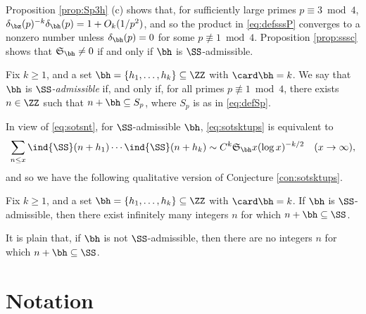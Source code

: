 \documentclass[12pt, reqno, twoside, letterpaper]{amsart}
\begin{document}
\begin{nixnix}
Proposition \ref{prop:Sp3h} (c) shows that, for sufficiently 
large primes $p \equiv 3 \bmod 4$, 
$\delta_{\bz}(p)^{-k}\delta_{\bh}(p) = 1 + O_k(1/p^2)$, and so 
the product in \eqref{eq:defsssP} converges to a nonzero number 
unless $\delta_{\bh}(p) = 0$ for some $p \not\equiv 1 \bmod 4$.
%
Proposition \ref{prop:sssc} shows that $\mathfrak{S}_{\bh} \ne 0$ 
if and only if $\bh$ is $\SS$-admissible.


\begin{definition}
 \label{def:Sadm}
%
Fix $k \ge 1$, and a set $\bh = \{h_1,\ldots,h_k\} \subseteq \ZZ$ 
with $\card \bh = k$.
%
We say that $\bh$ is {\em $\SS$-admissible} if, and only if, for 
all primes $p \not\equiv 1 \bmod 4$, there exists $n \in \ZZ$ such 
that $n + \bh \subseteq S_p$, where $S_p$ is as in 
\eqref{eq:defSp}.
%   
\end{definition}

\noindent
%
In view of \eqref{eq:sotsnt}, for $\SS$-admissible $\bh$, 
\eqref{eq:sotsktups} is equivalent to 
\begin{equation}
 \label{eq:equivsotsktups}
 \sum_{n \le x}
  \ind{\SS}(n + h_1)\cdots \ind{\SS}(n + h_k)
       \sim 
        C^k\mathfrak{S}_{\bh}
        x(\log x)^{-k/2}
         \quad 
       (x \to \infty),
\end{equation}
and so we have the following qualitative version of 
Conjecture \ref{con:sotsktups}.

\begin{conjecture} 
 \label{con:qualktups-hide}
Fix $k \ge 1$, and a set 
$\bh = \{h_1,\ldots,h_k\} \subseteq \ZZ$ with $\card \bh = k$. 
%
If $\bh$ is $\SS$-admissible, then there exist infinitely many 
integers $n$ for which $n + \bh \subseteq \SS$.
\end{conjecture}

\noindent
%
It is plain that, if $\bh$ is not $\SS$-admissible, then there 
are no integers $n$ for which $n + \bh \subseteq \SS$.
%
\end{nixnix}


\section{Notation}
 \label{sec:notation}
\end{document}

